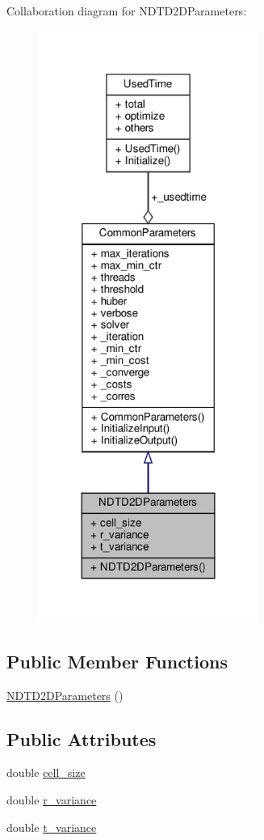 Collaboration diagram for N\+D\+T\+D2\+D\+Parameters\+:\nopagebreak
\begin{figure}[H]
\begin{center}
\leavevmode
\includegraphics[width=203pt]{d5/d0a/structNDTD2DParameters__coll__graph}
\end{center}
\end{figure}
\subsection*{Public Member Functions}
\begin{DoxyCompactItemize}
\item 
\hyperlink{structNDTD2DParameters_adf6e85193d96eaf0698046f8377c1e8d}{N\+D\+T\+D2\+D\+Parameters} ()
\end{DoxyCompactItemize}
\subsection*{Public Attributes}
\begin{DoxyCompactItemize}
\item 
double \hyperlink{structNDTD2DParameters_a11596c146b519eec89da7e741911c301}{cell\+\_\+size}
\item 
double \hyperlink{structNDTD2DParameters_a42fefb439c078f948a4657a19c083557}{r\+\_\+variance}
\item 
double \hyperlink{structNDTD2DParameters_a6fb531efcfe8f77c2bf003034094b544}{t\+\_\+variance}
\end{DoxyCompactItemize}


